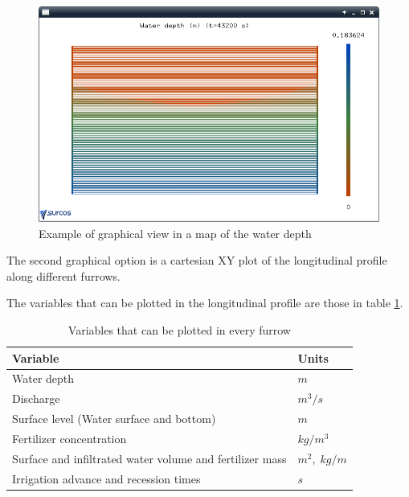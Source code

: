 \begin{figure}[!h]
\begin{center}
\includegraphics*[width=\textwidth]{images/evo1EN.png}
\qquad
\caption{Example of graphical view in a map of the water depth}\label{evo1}
\end{center}
\end{figure}

The second graphical option is a cartesian XY plot of the longitudinal profile along different furrows. 

The variables that can be plotted in the longitudinal profile are those in table \ref{tableVariables2}.

\begin{table}[h]\footnotesize
\begin{center}
\begin{tabular}{ll}
\hline
Variable & Units\\
\hline
Water depth & $m$ \\
Discharge & $ m^3/s $\\
Surface level (Water surface and bottom) & $ m $\\
Fertilizer concentration & $ kg/m^3 $\\
Surface and infiltrated water volume and fertilizer mass & $ m^2,\;kg/m $ \\
Irrigation advance and recession times & $ s $ \\
\hline
\end{tabular}
\end{center}
  \caption{Variables that can be plotted in every furrow}\label{tableVariables2}
\end{table}

